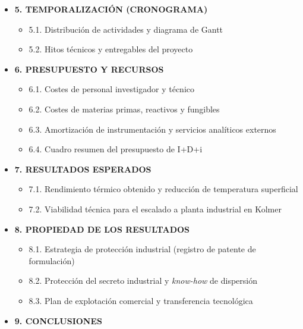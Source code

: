 \documentclass[11pt,a4paper]{article}
\begin{document}
\begin{itemize}[leftmargin=*, label={}]
    \vspace{0.4em}
    \item \textbf{5. TEMPORALIZACIÓN (CRONOGRAMA)}
    \begin{itemize}[leftmargin=1.5em, label={}]
        \item 5.1. Distribución de actividades y diagrama de Gantt
        \item 5.2. Hitos técnicos y entregables del proyecto
    \end{itemize}

    \vspace{0.4em}
    \item \textbf{6. PRESUPUESTO Y RECURSOS}
    \begin{itemize}[leftmargin=1.5em, label={}]
        \item 6.1. Costes de personal investigador y técnico
        \item 6.2. Costes de materias primas, reactivos y fungibles
        \item 6.3. Amortización de instrumentación y servicios analíticos externos
        \item 6.4. Cuadro resumen del presupuesto de I+D+i
    \end{itemize}

    \vspace{0.4em}
    \item \textbf{7. RESULTADOS ESPERADOS}
    \begin{itemize}[leftmargin=1.5em, label={}]
        \item 7.1. Rendimiento térmico obtenido y reducción de temperatura superficial
        \item 7.2. Viabilidad técnica para el escalado a planta industrial en Kolmer
    \end{itemize}

    \vspace{0.4em}
    \item \textbf{8. PROPIEDAD DE LOS RESULTADOS}
    \begin{itemize}[leftmargin=1.5em, label={}]
        \item 8.1. Estrategia de protección industrial (registro de patente de formulación)
        \item 8.2. Protección del secreto industrial y \textit{know-how} de dispersión
        \item 8.3. Plan de explotación comercial y transferencia tecnológica
    \end{itemize}

    \vspace{0.4em}
    \item \textbf{9. CONCLUSIONES}
\end{itemize}
\end{document}
